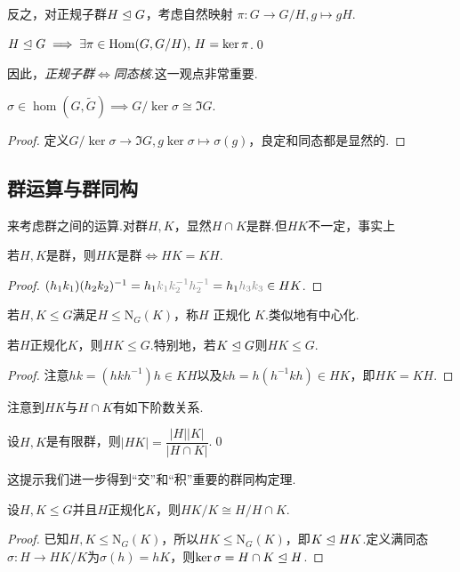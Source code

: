 反之，对正规子群$H\trianglelefteq G$，考虑{\heiti 自然映射} $\pi\colon G\to G/H,g\mapsto gH$.
\begin{prop}
	$H\trianglelefteq G\implies\exists\pi\in\operatorname*{Hom}(G,G/H),\,H=\ker\pi$.\qed
\end{prop}

因此，\emph{正规子群}$\Leftrightarrow$\emph{同态核}.这一观点非常重要.

\begin{thm}[(群同态基本定理)]
	$\sigma\in\hom(G,\tilde{G})\implies G/\ker\sigma\cong\Im G$.
\end{thm}
\begin{proof}
	定义$G/\ker\sigma\to\Im G,g\ker\sigma\mapsto\sigma(g)$，良定和同态都是显然的.
\end{proof}
\subsection{群运算与群同构}
来考虑群之间的运算.对群$H,K$，显然$H\cap K$是群.但$HK$不一定，事实上
\begin{lemma}
	若$H,K$是群，则$HK$是群$\iff HK=KH$.\hypertarget{lemma:HKgrp}{}
\end{lemma}
\begin{proof}
	$(h_1k_1)(h_2k_2)^{-1}=h_1{\color{gray}k_1k_2^{-1}h_2^{-1}}=h_1{\color{gray}h_3k_3}\in HK$.
\end{proof}

若$H,K\le G$满足$H\le\mathrm{N}_G(K)$，称$H$ {\heiti 正规化} $K$.类似地有{\heiti 中心化}.
\begin{cor}
	若$H$正规化$K$，则$HK\le G$.特别地，若$K\trianglelefteq G$则$HK\le G$.
\end{cor}
\begin{proof}
	注意$hk=(hkh^{-1})h\in KH$以及$kh=h(h^{-1}kh)\in HK$，即$HK=KH$.
\end{proof}

注意到$HK$与$H\cap K$有如下阶数关系.
\begin{lemma}
	设$H,K$是有限群，则$|HK|=\dfrac{|H||K|}{|H\cap K|}$.\qed
\end{lemma}

这提示我们进一步得到“交”和“积”重要的群同构定理.
\begin{thm}[(第一群同构)]
	设$H,K\le G$并且$H$正规化$K$，则$HK/K\cong H/H\cap K$.
\end{thm}
\begin{proof}
	已知$H,K\le\mathrm{N}_G(K)$，所以$HK\le\mathrm{N}_G(K)$，即$K\trianglelefteq HK$.定义满同态$\sigma\colon H\to HK/K$为$\sigma(h)=hK$，则$\ker\sigma=H\cap K\trianglelefteq H$.
\end{proof}


